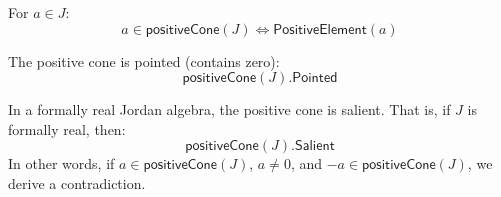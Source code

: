 \begin{theorem}
For $a \in J$:
\[ a \in \mathsf{positiveCone}(J) \iff \mathsf{PositiveElement}(a) \]
\end{theorem}

\begin{theorem}
The positive cone is pointed (contains zero):
\[ \mathsf{positiveCone}(J).\mathsf{Pointed} \]
\end{theorem}

\begin{theorem}
In a formally real Jordan algebra, the positive cone is salient. That is, if $J$ is formally real, then:
\[ \mathsf{positiveCone}(J).\mathsf{Salient} \]
In other words, if $a \in \mathsf{positiveCone}(J)$, $a \ne 0$, and $-a \in \mathsf{positiveCone}(J)$, we derive a contradiction.
\end{theorem}
